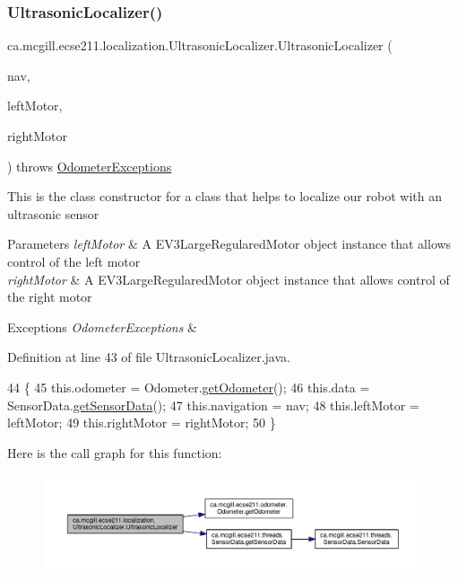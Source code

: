 \subsubsection{\texorpdfstring{Ultrasonic\+Localizer()}{UltrasonicLocalizer()}}
{\footnotesize\ttfamily ca.\+mcgill.\+ecse211.\+localization.\+Ultrasonic\+Localizer.\+Ultrasonic\+Localizer (\begin{DoxyParamCaption}\item[{\hyperlink{classca_1_1mcgill_1_1ecse211_1_1project_1_1_navigation}{Navigation}}]{nav,  }\item[{E\+V3\+Large\+Regulated\+Motor}]{left\+Motor,  }\item[{E\+V3\+Large\+Regulated\+Motor}]{right\+Motor }\end{DoxyParamCaption}) throws \hyperlink{classca_1_1mcgill_1_1ecse211_1_1odometer_1_1_odometer_exceptions}{Odometer\+Exceptions}}

This is the class constructor for a class that helps to localize our robot with an ultrasonic sensor


\begin{DoxyParams}{Parameters}
{\em left\+Motor} & A E\+V3\+Large\+Regulared\+Motor object instance that allows control of the left motor \\
\hline
{\em right\+Motor} & A E\+V3\+Large\+Regulared\+Motor object instance that allows control of the right motor \\
\hline
\end{DoxyParams}

\begin{DoxyExceptions}{Exceptions}
{\em Odometer\+Exceptions} & \\
\hline
\end{DoxyExceptions}


Definition at line 43 of file Ultrasonic\+Localizer.\+java.


\begin{DoxyCode}
44                                                                    \{
45     this.odometer = Odometer.\hyperlink{classca_1_1mcgill_1_1ecse211_1_1odometer_1_1_odometer_a99171f11e34dea918fa9dd069d721439}{getOdometer}();
46     this.data = SensorData.\hyperlink{classca_1_1mcgill_1_1ecse211_1_1threads_1_1_sensor_data_a8260aba53b4474ca1275e4ce26157977}{getSensorData}();
47     this.navigation = nav;
48     this.leftMotor = leftMotor;
49     this.rightMotor = rightMotor;
50   \}
\end{DoxyCode}
Here is the call graph for this function\+:\nopagebreak
\begin{figure}[H]
\begin{center}
\leavevmode
\includegraphics[width=350pt]{classca_1_1mcgill_1_1ecse211_1_1localization_1_1_ultrasonic_localizer_a3603202cdb5035c4e4164933b0aebeec_cgraph}
\end{center}
\end{figure}


